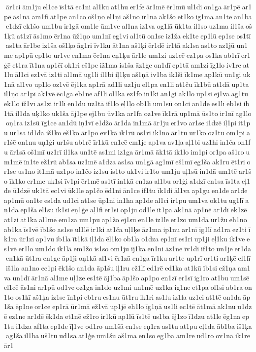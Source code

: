ār1ci ām1ju el1ce īs1tā ec1ni al1ku at1hu er1fe ār1mē ēr1mū ul1di on1ga ār1pē ar1pē ās1nā am1fi āt1pe an1co oš1ņo eļ1ņi aš1no īr1na āk1šo et1ko ig1ma an1te an1ba e1dzī ek1šo um1bu ir1gā om1le ūm1ve al1na iz1va og1lā ūk1ta il1so uz1ma il1ša oš1ķū at1zī ās1mo ēr1na ūž1ņo um1nī eg1vi al1tū on1se iz1ža ek1te ep1lū ep1se os1tī as1ta ār1be iz1ša oš1ķo āg1ri īv1ku āt1na aš1ķi ēr1dē ir1tā ak1sa as1to az1jū un1me ap1pū ep1to ur1ve en1ma ēc1na eņ1ķu ār1le um1zi uz1cē ez1pa os1ka ab1rī er1ģē et1ra īt1na ap1čī ok1ri eš1pe iž1ma is1ša āz1ģe on1dī ep1tā am1zi īg1lo iv1re at1lu āl1ci ez1vā iz1ti al1mā ug1li il1bi iļ1ķu aš1ņā iv1ba ik1ši īk1me ap1kū un1gi uk1nā al1vo up1lo oz1vē ēj1ka ap1rā ad1li uz1ju el1pa en1li at1ču īk1bū at1dā up1ta iļ1ņo ar1pī ak1vē ēc1ga eb1ne af1li ol1ka ez1fo in1ki an1gi ak1lo up1si ej1va ag1tu ek1ļo iž1vī as1zi ir1lī en1du uz1tā if1lo eļ1ļo ob1lī um1sū on1ci an1de es1lī ēb1si ib1tā il1da uķ1ko uk1ša āj1pe ej1bu ūv1ka ar1fa oz1ve īk1rā up1mā ūs1to ir1nī ag1lo oņ1ra iz1sū īg1ce an1dū iņ1vī e1džo ār1da īn1mā ār1ju er1vo ar1se i1dzē iļ1pi it1pu ur1sa id1da iš1ko eš1ķo ār1po ev1kā īk1rū os1ri ik1no ār1tu ur1ko oz1tu om1pi ar1šē on1nu uņ1ģi ur1šu ab1rē īr1kū en1cē em1je ap1va av1ļa aļ1bi uz1hi in1ča on1fu ār1sā oš1mī uz1rī il1ka un1tē as1mi iz1ga ār1mā āk1tā ik1lo im1pi or1pa aš1ro um1mē īn1te ež1rū ab1sa uz1mē a1dza as1sa un1gā ag1mī eš1mī eg1ša ak1ru ēt1ri or1se us1no it1mā uz1po in1čo iz1su is1to uk1vi ir1to um1ju uļ1sū in1dā um1tē ar1šo īk1ko er1me uk1si īv1pi ēr1mē as1tī in1kā en1za al1bu or1ģi a1dzī en1sa īs1ta eļ1de ū1dzē uk1tā ec1vi ūk1le ap1čo ēd1ni ān1ce if1tu īk1di āl1va ap1gu en1de ar1de ap1mū on1te es1da ud1ci at1se ūp1ni in1ha ap1de al1ci ir1pu um1va ok1tu ug1lī aņ1da ep1ša el1su īk1si eņ1ģe aļ1fi er1si op1ju od1le īt1pa ak1nā ap1nē ar1dī ek1zē at1zi āt1ka āl1mē em1za um1pu ap1žo ēj1sū en1le iz1lē er1zo um1dā ur1žu eh1no ab1ka īs1vē īb1šo as1se ul1lē ir1ki at1ča uļ1ķe āz1ma ip1nu ar1nī īg1lī ad1ra ez1ti īk1ra ūr1zi ap1vu ib1la īt1kā iļ1da ēl1ko ob1la o1dza ep1nī es1ri up1ji eļ1ku ik1ve es1vē er1lo um1do ik1lā em1žo is1so om1ju ij1ka en1ni āz1ne īv1di if1to un1je er1da en1kā ūt1ra en1ge āp1ji oņ1kā al1vi ēr1zā en1ga īr1ku ar1te up1rī or1ti ar1ķē el1lī iš1la an1no ec1pi ēk1šo an1da āp1šu iļ1ru ež1lī ed1rē ed1ka at1kū īb1si ež1ņa am1va un1dī ār1nā al1me uļ1ze es1tē āj1ba āp1šo ap1po en1zī er1sī ig1ro at1bu um1sē el1cē ās1ni ar1pū od1ve oz1ga in1do uz1mi un1mē uz1ka ig1ne et1pa ol1si ab1ra on1to os1kī aš1ķa iz1se īn1pi eb1ru es1nu ūt1ru ik1ri as1lu iz1la uz1ci at1tē on1da āp1ša ēp1ne or1ce ep1rā ūr1mā ež1vā up1jē eh1lo īg1ņā us1li ec1tē āt1mā ak1nu u1dzē ez1ne ar1dē ēk1da et1nē ež1ro ir1kū ap1lū īs1tē us1ba ēj1zo ī1dzu at1le ēg1na ep1tu i1dza af1ta ep1de īļ1ve od1ro um1šā en1se eņ1ra as1tu at1pu eļ1da āb1ba iš1ķa āg1ša il1bā ūš1tu ud1sa at1ģe um1šu aš1mā en1so eg1ba am1re ud1ro ov1na ik1re ār1